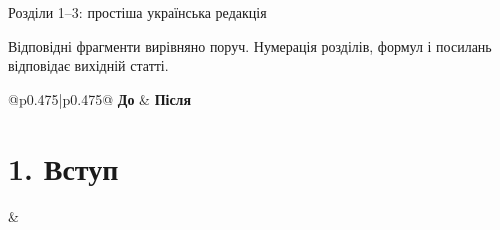 ﻿\documentclass[11pt]{article}
\begin{document}
\begin{center}\Large Розділи 1--3: простіша українська редакція\end{center}
Відповідні фрагменти вирівняно поруч. Нумерація розділів, формул і посилань відповідає вихідній статті.
\setlength{\tabcolsep}{6mm}
\begin{longtable}{@{}p{0.475\textwidth}|p{0.475\textwidth}@{}}
\Large\textbf{До} & \Large\textbf{Після}\\\hline\endhead
\begin{minipage}[t]{\linewidth}
\section*{1. Вступ}
\end{minipage} &
\begin{minipage}[t]{\linewidth}

\end{minipage}
\end{longtable}
\end{document}
